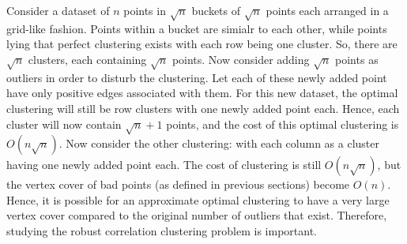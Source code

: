 Consider a dataset of $n$ points in $\sqrt{n}$ buckets of $\sqrt{n}$ points each arranged in a grid-like fashion. Points within a bucket are simialr to each other, while points lying 
 that perfect clustering exists with each row being one cluster. So, there are $\sqrt{n}$ clusters, each containing $\sqrt{n}$ points. Now consider adding $\sqrt{n}$ points as outliers in order to disturb the clustering. Let each of these newly added point have only positive edges associated with them. For this new dataset, the optimal clustering will still be row clusters with one newly added point each. Hence, each cluster will now contain $\sqrt{n}+1$ points, and the cost of this optimal clustering is $O(n\sqrt{n})$. Now consider the other clustering: with each column as a cluster having one newly added point each. The cost of clustering is still $O(n\sqrt{n})$, but the vertex cover of bad points (as defined in previous sections) become $O(n)$. Hence, it is possible for an approximate optimal clustering to have a very large vertex cover compared to the original number of outliers that exist. Therefore, studying the robust correlation clustering problem is important.
